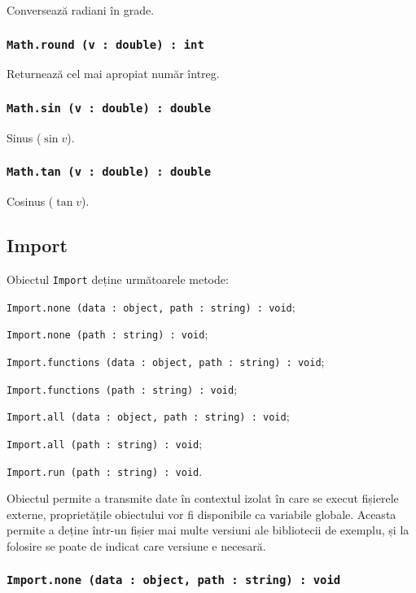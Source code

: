 Conversează radiani în grade.

\subsubsection{\lstinline|Math.round (v : double) : int|}

Returnează cel mai apropiat număr întreg.

\subsubsection{\lstinline|Math.sin (v : double) : double|}

Sinus ($\sin{v}$).

\subsubsection{\lstinline|Math.tan (v : double) : double|}

Cosinus ($\tan{v}$).

\subsection{{\color{orange} Import}}

Obiectul \lstinline|Import| deține următoarele metode:
\begin{icItems}
	\item \lstinline|Import.none (data : object, path : string) : void|;
	\item \lstinline|Import.none (path : string) : void|;
	\item \lstinline|Import.functions (data : object, path : string) : void|;
	\item \lstinline|Import.functions (path : string) : void|;
	\item \lstinline|Import.all (data : object, path : string) : void|;
	\item \lstinline|Import.all (path : string) : void|;
	\item \lstinline|Import.run (path : string) : void|.
\end{icItems}

Obiectul  permite a transmite date în contextul izolat în care se execut fișierele externe, proprietățile obiectului  vor fi disponibile ca variabile globale. Aceasta permite a deține într-un fișier mai multe versiuni ale bibliotecii de exemplu, și la folosire se poate de indicat care versiune e necesară.

\subsubsection{\lstinline|Import.none (data : object, path : string) : void|}

